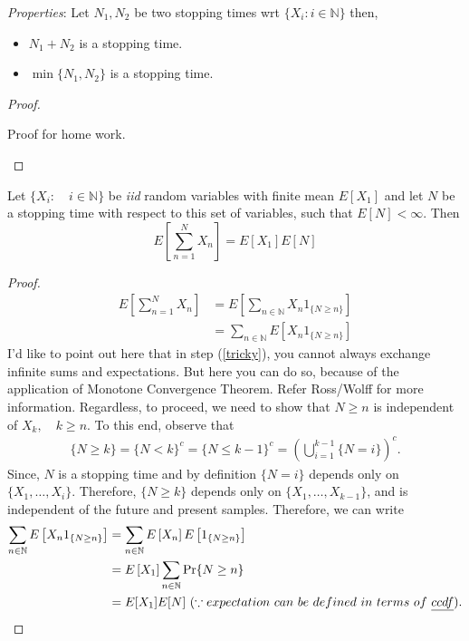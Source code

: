 \documentclass[a4paper,10pt, english]{article}
\begin{document}
\emph{Properties}: Let $N_1,N_2$ be two stopping times wrt $\{X_i : i \in \mathbb{N} \} $ then,
\begin{itemize}
	\item $N_1+N_2$ is a stopping time.
	\item $\min \{N_1,N_2\} $ is a stopping time.
\end{itemize}
\begin{proof}
	\begin{note}
		Proof for home work.
	\end{note}
\end{proof}

\begin{lem}
	Let $\{X_i:\quad i\in \mathbb{N}\}$ be \emph{iid} random variables with finite mean $E[X_1]$ and let $N$ be a stopping time with respect to this set of variables, such that $E[N] < \infty$. Then
	\[E\left[\sum_{n=1}^N X_n\right] = E[X_1]E[N]\]
\end{lem}
\begin{proof}
	\begin{align}
	E\left[\sum_{n=1}^N X_n\right] &= E\left[\sum_{n \in \mathbb{N}} X_n 1_{\{N \geq n\}}\right]  \\
	&= \sum_{n \in \mathbb{N}} E\left[X_n 1_{\{N \geq n\}}\right] \label{tricky}
	\end{align}
	I'd like to point out here that in step (\ref{tricky}), you cannot always exchange infinite sums and expectations. But here you can do so, because of the application of Monotone Convergence Theorem. Refer Ross/Wolff for more information. Regardless, to proceed, we need to show that $N \geq n$ is independent of $X_k, \quad k \geq n$. To this end, observe that 
	\begin{align*}
	\{N \geq k\} = \{N < k\}^c = \{N \leq k-1\}^c = \left(\bigcup_{i=1}^{k-1} \{N = i\}\right)^c. 
	\end{align*}
	Since, $N$ is a stopping time and by definition $\{N=i\}$ depends only on $\{X_1,\ldots, X_i\}$. Therefore, $\{N \geq k\}$ depends only on $\{X_1,\ldots, X_{k-1}\}$, and is independent of the future and present samples. Therefore, we can write
	\begin{align*}
	\sum_{n \in \mathbb{N}} E\left[X_n 1_{\{N \geq n\}}\right] &= \sum_{n \in \mathbb{N}} E\left[X_n\right]E\left[ 1_{\{N \geq n\}}\right] \\
	&= E\left[X_1\right] \sum_{n \in \mathbb{N}} \Pr\{N \geq n\} \\
	&= E[X_1]E[N] ~(\because expectation~can~be~defined~ in~ terms~ of~ \emph{ccdf}).
	\end{align*} 
\end{proof}
\end{document}
